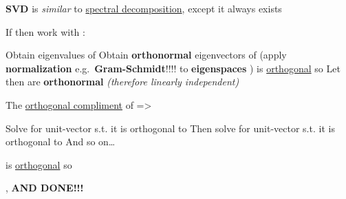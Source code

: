\hSep %

\textbf{SVD} is \emph{similar} to \ul{spectral decomposition}, except it always exists

If  then work with :
\begin{itemize}
      \vItem
            Obtain eigenvalues
             of
      \vItem
            Obtain \textbf{orthonormal} eigenvectors
             of
             (apply \textbf{normalization}
            e.g.~\textbf{Gram-Schmidt}!!!! to \textbf{eigenspaces}
            )
      \vItem
            is \ul{orthogonal} so 
      \vItem
      \vItem
            Let
            then
             are
            \textbf{orthonormal} \emph{(therefore linearly independent)}

            \begin{itemize}

                  \vItem
                        The \ul{orthogonal compliment} of
                        =\textgreater{}

                        \begin{itemize}

                              \vItem
                                    Solve for unit-vector  s.t. it is
                                    orthogonal to 
                              \vItem
                                    Then solve for unit-vector  s.t. it is
                                    orthogonal to 
                              \vItem
                                    And so on\ldots{}
                        \end{itemize}
                  \vItem
                        is \ul{orthogonal} so 
            \end{itemize}
      \vItem
            ,
            \textbf{AND DONE!!!}
\end{itemize}

